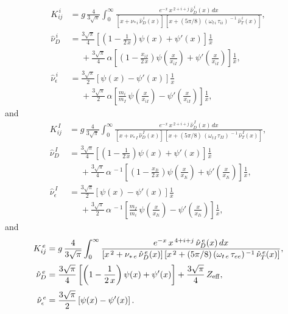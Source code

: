 \documentclass[12pt]{article}
\begin{document}
\begin{align}
K_{ij}^{\,i} &= g\,\frac{4}{3\sqrt{\pi}}\int_0^\infty
\frac{e^{-x}\,x^{\,2+i+j}\,\hat{\nu}_D^{\,i}(x)\,dx}{[x+\nu_{\ast\,i}\,\hat{\nu}_D^{\,i}(x)]\,[x+(5\pi/8)\,(\omega_{t\,i}\,\tau_{ii})^{\,-1}\,\hat{\nu}_T^{\,i}(x)]},\\[0.5ex]
\hat{\nu}_D^{\,i}&= \frac{3\sqrt{\pi}}{4}\left[\left(1-\frac{1}{2\,x}\right)\psi(x)+\psi'(x)\right]\frac{1}{x}\nonumber\\[0.5ex]&\phantom{=}
+\frac{3\sqrt{\pi}}{4}\,\alpha\left[\left(1-\frac{x_{iI}}{2\,x}\right)\psi\!\left(\frac{x}{x_{iI}}\right)
+\psi'\!\left(\frac{x}{x_{iI}}\right)\right]\frac{1}{x},\\[0.5ex]
\hat{\nu}_\epsilon^{\,i}&= \frac{3\sqrt{\pi}}{2}\left[\psi(x)-\psi'(x)\right]\frac{1}{x}\nonumber\\[0.5ex]&\phantom{=}
+\frac{3\sqrt{\pi}}{2}\,\alpha\left[\frac{m_i}{m_I}\,\psi\!\left(\frac{x}{x_{iI}}\right)
-\psi'\!\left(\frac{x}{x_{iI}}\right)\right]\frac{1}{x},
\end{align}
and
\begin{align}
K_{ij}^{\,I}& = g\,\frac{4}{3\sqrt{\pi}}\int_0^\infty
\frac{e^{-x}\,x^{\,2+i+j}\,\hat{\nu}_D^{\,I}(x)\,dx}{[x+\nu_{\ast\,I}\,\hat{\nu}_D^{\,I}(x)]\,[x+(5\pi/8)\,(\omega_{t\,I}\,\tau_{II})^{\,-1}\,\hat{\nu}_T^{\,I}(x)]},\\[0.5ex]
\hat{\nu}_D^{\,I}&= \frac{3\sqrt{\pi}}{4}\left[\left(1-\frac{1}{2\,x}\right)\psi(x)+\psi'(x)\right]\frac{1}{x}\nonumber\\[0.5ex]&\phantom{=}
+\frac{3\sqrt{\pi}}{4}\,\alpha^{\,-1}\left[\left(1-\frac{x_{Ii}}{2\,x}\right)\psi\!\left(\frac{x}{x_{Ii}}\right)
+\psi'\!\left(\frac{x}{x_{Ii}}\right)\right]\frac{1}{x},\\[0.5ex]
\hat{\nu}_\epsilon^{\,I}&= \frac{3\sqrt{\pi}}{2}\left[\psi(x)-\psi'(x)\right]\frac{1}{x}\nonumber\\[0.5ex]&\phantom{=}
+\frac{3\sqrt{\pi}}{2}\,\alpha^{\,-1}\left[\frac{m_I}{m_i}\,\psi\!\left(\frac{x}{x_{Ii}}\right)
-\psi'\!\left(\frac{x}{x_{Ii}}\right)\right]\frac{1}{x},
\end{align}
and
\begin{align}
K_{ij}^{\,e}& = g\,\frac{4}{3\sqrt{\pi}}\int_0^\infty
\frac{e^{-x}\,x^{\,4+i+j}\,\hat{\nu}_D^{\,e}(x)\,dx}{[x^{\,2}+\nu_{\ast\,e}\,\hat{\nu}_D^{\,e}(x)]\,[x^{\,2}+(5\pi/8)\,(\omega_{t\,e}\,\tau_{ee})^{\,-1}\,\hat{\nu}_T^{\,e}(x)]},\\[0.5ex]
\hat{\nu}_D^{\,e}&= \frac{3\sqrt{\pi}}{4}\left[\left(1-\frac{1}{2\,x}\right)\psi(x)+\psi'(x)\right]+\frac{3\sqrt{\pi}}{4}\,Z_{\rm eff},\\[0.5ex]
\hat{\nu}_\epsilon^{\,e}&= \frac{3\sqrt{\pi}}{2}\left[\psi(x)-\psi'(x)\right].
\end{align}
\end{document}
